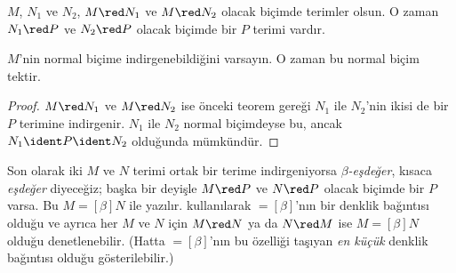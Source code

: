 \documentclass[../../../include/open-logic-section]{subfiles}
\begin{document}

\begin{thm}
$M$, $N_1$ ve $N_2$, $M\red N_1$ ve $M\red N_2$ olacak biçimde terimler
olsun. O zaman $N_1\red P$ ve $N_2\red P$ olacak biçimde bir $P$ terimi
vardır.
\end{thm}

\begin{cor}
$M$'nin normal biçime indirgenebildiğini varsayın. O zaman bu normal biçim
tektir.
\end{cor}

\begin{proof}
$M\red N_1$ ve $M\red N_2$ ise önceki teorem gereği $N_1$ ile $N_2$'nin
ikisi de bir $P$ terimine indirgenir. $N_1$ ile $N_2$ normal biçimdeyse bu,
ancak $N_1\ident P\ident N_2$ olduğunda mümkündür.
\end{proof}

Son olarak iki $M$ ve $N$ terimi ortak bir terime indirgeniyorsa
\emph{$\beta$-eşdeğer}, kısaca \emph{eşdeğer} diyeceğiz; başka bir deyişle
$M\red P$ ve $N\red P$ olacak biçimde bir $P$ varsa. Bu $M\equal[\beta]N$
ile yazılır.  kullanılarak $\equal[\beta]$'nın bir
denklik bağıntısı olduğu ve ayrıca her $M$ ve $N$ için $M\red N$ ya da
$N\red M$ ise $M\equal[\beta]N$ olduğu denetlenebilir. (Hatta
$\equal[\beta]$'nın bu özelliği taşıyan \emph{en küçük} denklik bağıntısı
olduğu gösterilebilir.)
\end{document}

